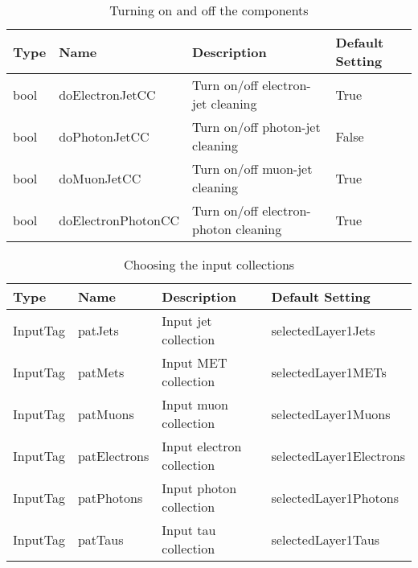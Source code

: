 \documentclass{cmspaper}
\begin{document}
\begin{table}[h]
\caption{Turning on and off the components}
\begin{center}
\begin{tabular}{l|l|l|l}
\textbf{Type} & \textbf{Name} & \textbf{Description} & \textbf{Default
    Setting} \\ \hline
    bool & doElectronJetCC   & Turn on/off electron-jet cleaning & True
    \\\hline
    bool & doPhotonJetCC     & Turn on/off photon-jet cleaning  & False
    \\\hline
    bool & doMuonJetCC       & Turn on/off muon-jet cleaning     & True
    \\\hline
    bool & doElectronPhotonCC& Turn on/off electron-photon cleaning & True
\end{tabular}
\end{center}
\label{tab:TurnOnModules}
\end{table}

\begin{table}[h]
\caption{Choosing the input collections}
\begin{center}
\begin{tabular}{l|l|l|l}
\textbf{Type} & \textbf{Name} & \textbf{Description} & \textbf{Default
Setting} \\ \hline
InputTag & patJets      & Input jet collection   & selectedLayer1Jets
\\\hline
InputTag & patMets      & Input MET collection   & selectedLayer1METs
\\\hline
InputTag & patMuons     & Input muon collection  & selectedLayer1Muons
\\\hline
InputTag & patElectrons & Input electron collection &
selectedLayer1Electrons 
\\\hline
InputTag & patPhotons   & Input photon collection& selectedLayer1Photons
\\\hline
InputTag & patTaus      & Input tau collection   & selectedLayer1Taus
\end{tabular}
\end{center}
\label{tab:InputCollections}
\end{table}
\end{document}
